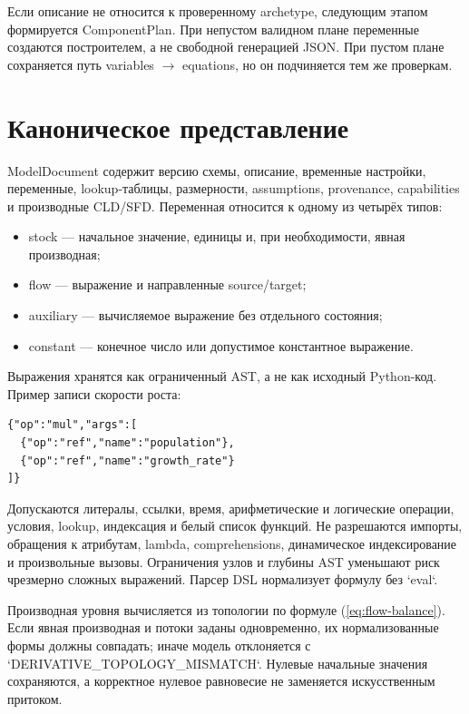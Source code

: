 Если описание не относится к проверенному archetype, следующим этапом формируется ComponentPlan. При непустом валидном плане переменные создаются построителем, а не свободной генерацией JSON. При пустом плане сохраняется путь variables $\rightarrow$ equations, но он подчиняется тем же проверкам.

\section{Каноническое представление}

ModelDocument содержит версию схемы, описание, временные настройки, переменные, lookup-таблицы, размерности, assumptions, provenance, capabilities и производные CLD/SFD. Переменная относится к одному из четырёх типов:

\begin{itemize}
    \item stock --- начальное значение, единицы и, при необходимости, явная производная;
    \item flow --- выражение и направленные source/target;
    \item auxiliary --- вычисляемое выражение без отдельного состояния;
    \item constant --- конечное число или допустимое константное выражение.
\end{itemize}

Выражения хранятся как ограниченный AST, а не как исходный Python-код. Пример записи скорости роста:

\begin{lstlisting}[caption={Фрагмент канонического AST}]
{"op":"mul","args":[
  {"op":"ref","name":"population"},
  {"op":"ref","name":"growth_rate"}
]}
\end{lstlisting}

Допускаются литералы, ссылки, время, арифметические и логические операции, условия, lookup, индексация и белый список функций. Не разрешаются импорты, обращения к атрибутам, lambda, comprehensions, динамическое индексирование и произвольные вызовы. Ограничения узлов и глубины AST уменьшают риск чрезмерно сложных выражений. Парсер DSL нормализует формулу без `eval`.

Производная уровня вычисляется из топологии по формуле (\ref{eq:flow-balance}). Если явная производная и потоки заданы одновременно, их нормализованные формы должны совпадать; иначе модель отклоняется с `DERIVATIVE\_TOPOLOGY\_MISMATCH`. Нулевые начальные значения сохраняются, а корректное нулевое равновесие не заменяется искусственным притоком.

